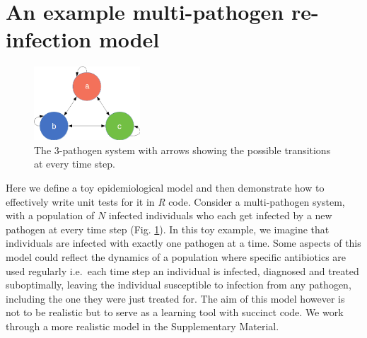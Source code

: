 \documentclass[]{elsarticle} %
\begin{document}
\hypertarget{an-example-multi-pathogen-re-infection-model}{%
\section{An example multi-pathogen re-infection model}\label{an-example-multi-pathogen-re-infection-model}}

\begin{figure}[h]

{\centering \includegraphics[width=150px,]{figures/modelexample} 

}

\caption{The 3-pathogen system with arrows showing the possible transitions at every time step.}\label{fig:modelexample}
\end{figure}

Here we define a toy epidemiological model and then demonstrate how to effectively write unit tests for it in \emph{R} code.
Consider a multi-pathogen system, with a population of \(N\) infected individuals who each get infected by a new pathogen at every time step (Fig. \ref{fig:modelexample}).
In this toy example, we imagine that individuals are infected with exactly one pathogen at a time.
Some aspects of this model could reflect the dynamics of a population where specific antibiotics are used regularly i.e.~each time step an individual is infected, diagnosed and treated suboptimally, leaving the individual susceptible to infection from any pathogen, including the one they were just treated for.
The aim of this model however is not to be realistic but to serve as a learning tool with succinct code.
We work through a more realistic model in the Supplementary Material.
\end{document}
